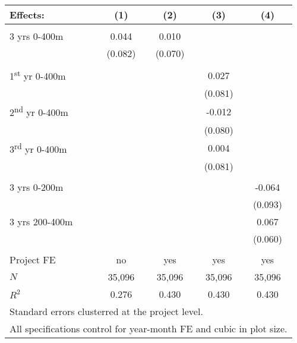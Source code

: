 {
\def\sym#1{\ifmmode^{#1}\else\(^{#1}\)\fi}
\begin{tabular}{l*{4}{c}}
Effects: & (1) & (2) & (3) & (4) \\[0.2em]
\hline\\[-0.9em]

3 yrs 0-400m                     &    0.044         &    0.010         &                  &           \\
                                 &  (0.082)         &  (0.070)         &                  &           \\
[0.2em]\hline \\[-0.9em]

1\textsuperscript{st} yr 0-400m  &                  &                  &    0.027         &           \\
                                 &                  &                  &  (0.081)         &           \\
 
2\textsuperscript{nd} yr 0-400m  &                  &                  &   -0.012         &           \\
                                 &                  &                  &  (0.080)         &           \\

3\textsuperscript{rd} yr 0-400m  &                  &                  &    0.004         &           \\
                                 &                  &                  &  (0.081)         &           \\[0.2em]
\hline\\[-0.9em]

3 yrs 0-200m                     &                  &                  &                  &   -0.064  \\
                                 &                  &                  &                  &  (0.093)  \\

3 yrs 200-400m                   &                  &                  &                  &    0.067  \\
                                 &                  &                  &                  &  (0.060)  \\[0.2em]
\hline \\[-0.9em]
Project FE                       &     no           &    yes           &      yes         &      yes  \\    
\(N\)                            &    35,096        &    35,096        &    35,096        &    35,096        \\
\(R^{2}\)                        &    0.276         &    0.430         &    0.430         &    0.430         \\
\hline
\multicolumn{5}{l}{\tiny Standard errors clusterred at the project level.} \\[-.4em]
\multicolumn{5}{l}{\tiny All specifications control for year-month FE and cubic in plot size.}
\end{tabular}
}